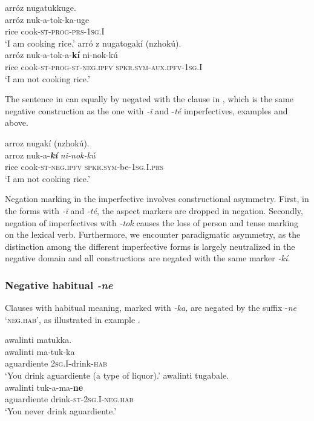 \documentclass[output=paper,colorlinks,citecolor=brown]{langscibook}
\begin{document}
\ea\label{ex:kog:12}
    \ea\label{ex:kog:12a}arróz nugatukkuge.\\ 
        \gll  arróz nuk-a-tok-ka-uge\\ 
              rice cook\textsc{{}-st}{}-\textsc{prog{}-prs-1sg.I}\\
        \glt ‘I am cooking rice.’
    \ex\label{ex:kog:12b}arr\'{o} z nugatogak\'{i} (nzhokú).\\
        \gll  arróz nuk{}-a-tok-a-\textbf{kí} ni-nok-kú\\
              rice cook{}-\textsc{st}{}-\textsc{prog{}-st{}-neg.ipfv} \textsc{spkr.sym-aux.ipfv}{}-\textsc{1sg.I}\\
        \glt ‘I am not cooking rice.’
    \z
\z  

The sentence in  can equally by negated with the clause in , which is the same negative construction as the one with \textit{{}-\~{i} } and -\textit{té} imperfectives, examples  and  above.

\ea\label{ex:kog:13} arroz nugakí (nzhokú).\\
    \gll  arroz nuk{}-a-\textbf{\textit{kí}} \textit{ni-nok-kú}\\ 
          rice cook{}-\textsc{st-neg.ipfv} \textsc{spkr.sym-}be-\textsc{1sg.I.prs}\\
    \glt ‘I am not cooking rice.’
\z 

Negation marking in the imperfective involves constructional asymmetry. First, in the forms with \textit{{}-\~{i} } and \textit{{}-té}, the aspect markers are dropped in negation. Secondly, negation of imperfectives with \textit{{}-tok} causes the loss of person and tense marking on the lexical verb. Furthermore, we encounter paradigmatic asymmetry, as the distinction among the different imperfective forms is largely neutralized in the negative domain and all constructions are negated with the same marker \textit{\nobreakdash-kí.}

\subsubsection{Negative habitual \textit{-ne}}\label{sec:kog:2.1.3}

Clauses with habitual meaning, marked with \textit{{}-ka,} are negated by the suffix {}-\textit{ne} ‘\textsc{neg.hab’}, as illustrated in example . 

\ea\label{ex:kog:14}
    \ea\label{ex:kog:14a}awalinti matukka.\\
        \gll  awalinti ma-tuk-ka\\ 
              aguardiente \textsc{2sg.I{}-}drink{}-\textsc{hab}\\
        \glt  ‘You drink aguardiente (a type of liquor).’
    \ex\label{ex:kog:14b} awalinti tugabale.\\
        \gll  awalinti tuk{}-a{}-ma-\textbf{ne}\\
              aguardiente drink{}-\textsc{st{}-2sg.I{}-neg.hab}\\
        \glt ‘You never drink aguardiente.’
    \z
\z 
\end{document}
